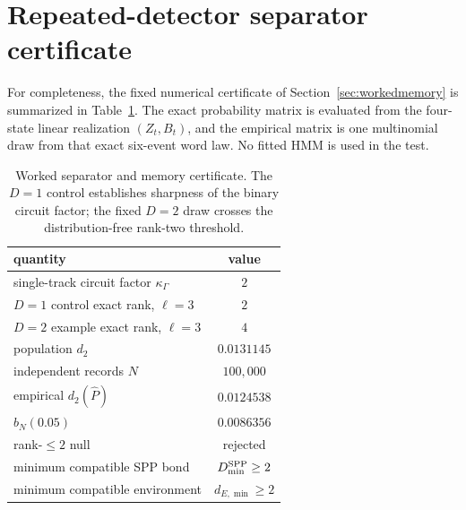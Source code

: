 \documentclass[11pt]{article}
\begin{document}
\section{Repeated-detector separator certificate}
\label{app:separatorcert}
For completeness, the fixed numerical certificate of Section~\ref{sec:workedmemory} is summarized in Table~\ref{tab:separatorcert}. The exact probability matrix is evaluated from the four-state linear realization $(Z_t,B_t)$, and the empirical matrix is one multinomial draw from that exact six-event word law. No fitted HMM is used in the test.

\begin{table}[H]
\centering
\caption{Worked separator and memory certificate. The $D=1$ control establishes sharpness of the binary circuit factor; the fixed $D=2$ draw crosses the distribution-free rank-two threshold.}
\label{tab:separatorcert}
\begin{tabular}{lc}
\toprule
quantity & value \\
\midrule
single-track circuit factor $\kappa_\Gamma$ & $2$ \\
$D=1$ control exact rank, $\ell=3$ & $2$ \\
$D=2$ example exact rank, $\ell=3$ & $4$ \\
population $d_2$ & $0.0131145$ \\
independent records $N$ & $100{,}000$ \\
empirical $d_2(\widehat P)$ & $0.0124538$ \\
$b_N(0.05)$ & $0.0086356$ \\
rank-$\le2$ null & rejected \\
minimum compatible SPP bond & $D_{\min}^{\rm SPP}\ge2$ \\
minimum compatible environment & $d_{E,\min}\ge2$ \\
\bottomrule
\end{tabular}
\end{table}
\end{document}
